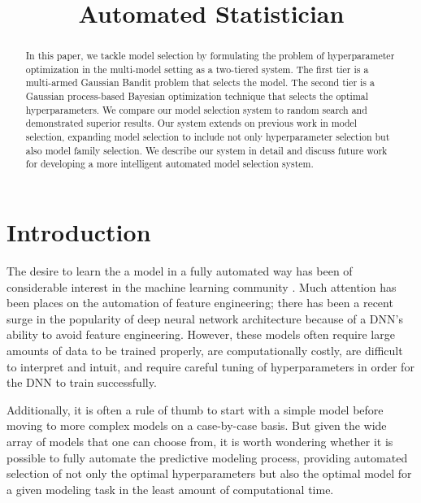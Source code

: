 \documentclass{article}
\title{Automated Statistician}
\begin{document}
 


\begin{abstract} 
In this paper, we tackle model selection by formulating the problem of hyperparameter optimization in the multi-model setting as a two-tiered system. The first tier is a multi-armed Gaussian Bandit problem that selects the model. The second tier is a Gaussian process-based Bayesian optimization technique that selects the optimal hyperparameters. We compare our model selection system to random search and demonstrated superior results. Our system extends on previous work in model selection, expanding model selection to include not only hyperparameter selection but also model family selection. We describe our system in detail and discuss future work for developing a more intelligent automated model selection system.
\end{abstract} 

\section{Introduction}
The desire to learn the a model in a fully automated way has been of considerable interest in the machine learning community \cite{deepfeature}. Much attention has been places on the automation of feature engineering; there has been a recent surge in the popularity of deep neural network architecture because of a DNN's ability to avoid feature engineering. However, these models often require large amounts of data to be trained properly, are computationally costly, are difficult to interpret and intuit, and require careful tuning of hyperparameters in order for the DNN to train successfully. 

Additionally, it is often a rule of thumb to start with a simple model before moving to more complex models on a case-by-case basis. But given the wide array of models that one can choose from, it is worth wondering whether it is possible to fully automate the predictive modeling process, providing automated selection of not only the optimal hyperparameters but also the optimal model for a given modeling task in the least amount of computational time.
\end{document}
